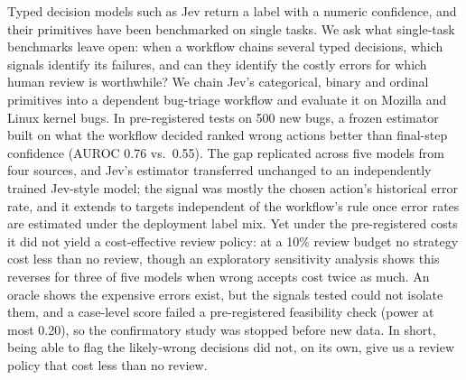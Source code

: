 Typed decision models such as Jev return a label with a numeric
confidence, and their primitives have been benchmarked on single tasks.
We ask what single-task benchmarks leave open: when a workflow chains
several typed decisions, which signals identify its failures, and
can they identify the costly errors for which human review is worthwhile?
We chain Jev's categorical, binary and ordinal primitives into a
dependent bug-triage workflow and evaluate it on Mozilla and Linux kernel
bugs. In pre-registered tests on 500 new bugs, a frozen estimator built
on what the workflow decided ranked wrong actions better than final-step
confidence (AUROC 0.76 vs.\ 0.55). The gap replicated across five models
from four sources, and Jev's estimator transferred unchanged to an
independently trained Jev-style model; the signal was mostly the chosen
action's historical error rate, and it extends to targets independent of
the workflow's rule once error rates are estimated under the deployment
label mix. Yet under the pre-registered costs it did
not yield a cost-effective review policy: at a 10\% review budget no
strategy cost less than no review, though an exploratory sensitivity
analysis shows this reverses for three of five models when wrong accepts
cost twice as much. An oracle shows the expensive errors exist, but the signals
tested could not isolate them, and a case-level score failed a
pre-registered feasibility check (power at most 0.20), so the
confirmatory study was stopped before new data. In short, being able to
flag the likely-wrong decisions did not, on its own, give us a review
policy that cost less than no review.
